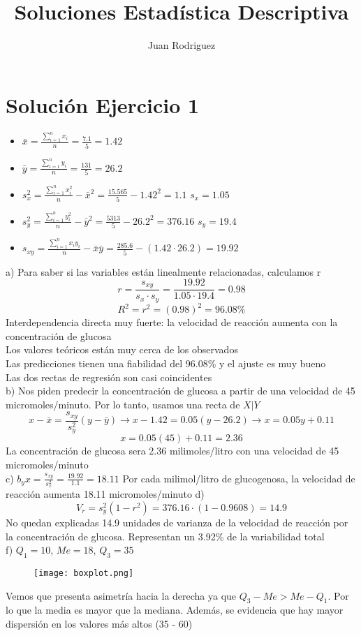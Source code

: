 \documentclass[fleqn]{article}
\title{Soluciones Estadística Descriptiva}
\author{Juan Rodriguez}
\begin{document}
	\maketitle
	\section{Solución Ejercicio 1}
	\begin{itemize}
		\item $\bar{x} = \frac{\sum_{i=1}^n x_i}{n} = \frac{7.1}{5} = 1.42$
		\item $\bar{y} = \frac{\sum_{i=1}^n y_i}{n} = \frac{131}{5} = 26.2$ 
		\item $s_x^{2} = \frac{\sum_{i=1}^n x_i^{2}}{n} - \bar{x}^{2} = \frac{15.565}{5} - 1.42^{2} = 1.1$ $s_x = 1.05$
		\item $s_y^{2} = \frac{\sum_{i=1}^n y_i^{2}}{n} - \bar{y}^{2} = \frac{5313}{5} - 26.2^{2} = 376.16$ $s_y = 19.4$
		\item $s_{xy} = \frac{\sum_{i=1}^n x_i y_i}{n} - \bar{x} \bar{y} = \frac{285.6}{5} - (1.42 \cdot 26.2) = 19.92$
	\end{itemize}
	a) Para saber si las variables están linealmente relacionadas, calculamos r
	\[
	r = \frac{s_{xy}}{s_x \cdot s_y} = \frac{19.92}{1.05 \cdot 19.4} = \boxed{0.98}
	\]
	\[
	R^2 = r^2 = (0.98)^{2} = \boxed{96.08\%}
	\]
	Interdependencia directa muy fuerte: la velocidad de reacción aumenta con la concentración de glucosa \\
	Los valores teóricos están muy cerca de los observados \\
	Las predicciones tienen una fiabilidad del 96.08\% y el ajuste es muy bueno \\
	Las dos rectas de regresión son casi coincidentes \\
	b) Nos piden predecir la concentración de glucosa a partir de una velocidad de 45 micromoles/minuto. Por lo tanto, usamos una recta de $X | Y$
	\[
	x - \bar{x} = \frac{s_{xy}}{s_y^{2}} (y - \bar{y}) \rightarrow x - 1.42 = 0.05(y - 26.2) \rightarrow x = 0.05y + 0.11
	\]
	\[
	x = 0.05(45) + 0.11 = 2.36
	\]
	La concentración de glucosa sera 2.36 milimoles/litro con una velocidad de 45 micromoles/minuto \\
	c) $b_yx = \frac{s_{xy}}{s_x^2} = \frac{19.92}{1.1} = 18.11$
	Por cada milimol/litro de glucogenosa, la velocidad de reacción aumenta 18.11 micromoles/minuto
	d)
	\[
	V_r = s_y^2 (1-r^2) = 376.16 \cdot (1-0.9608) = \boxed{14.9} 
	\]
	No quedan explicadas 14.9 unidades de varianza de la velocidad de reacción por la concentración de glucosa. Representan un 3.92\% de la variabilidad total \\
	f) $Q_1 = 10$, $Me = 18$, $Q_3 = 35$
	\begin{figure}[H]
		\texttt{[image: boxplot.png]}
	\end{figure}
	Vemos que presenta asimetría hacia la derecha ya que $Q_3 - Me > Me - Q_1$. Por lo que la media es mayor que la mediana. Además, se evidencia que hay mayor dispersión en los valores más altos (35 - 60)
\end{document}

